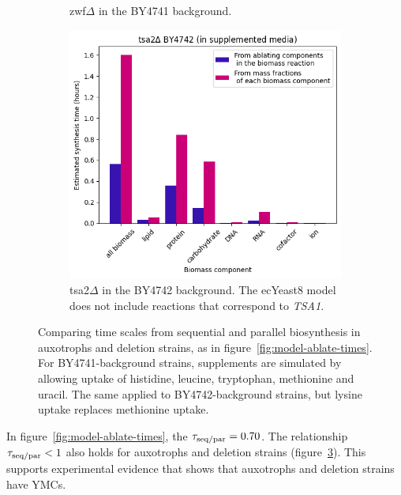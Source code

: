 \begin{figure}
\begin{subfigure}[htpb]{0.45\textwidth}
   \caption{
     zwf$\Delta$ in the BY4741 background.
   }
   \label{fig:model-ablation-zwf1}
  \end{subfigure}
  \begin{subfigure}[htpb]{0.45\textwidth}
   \centering
   \includegraphics[width=\textwidth]{ablation_tsa2}
   \caption{
     tsa2$\Delta$ in the BY4742 background.  The ecYeast8 model does not include reactions that correspond to \textit{TSA1}.
   }
   \label{fig:model-ablation-tsa2}
  \end{subfigure}
  \caption{
    Comparing time scales from sequential and parallel biosynthesis in auxotrophs and deletion strains, as in figure~\ref{fig:model-ablate-times}.
    For BY4741-background strains, supplements are simulated by allowing uptake of histidine, leucine, tryptophan, methionine and uracil.
    The same applied to BY4742-background strains, but lysine uptake replaces methionine uptake.
  }
  \label{fig:model-ablation-strains}
\end{figure}

In figure~\ref{fig:model-ablate-times}, the $\tau_{\mathrm{seq}/\mathrm{par}} = 0.70$.
The relationship $\tau_{\mathrm{seq}/\mathrm{par}} < 1$ also holds for auxotrophs and deletion strains (figure~\ref{fig:model-ablation-strains}).
This supports experimental evidence that shows that auxotrophs and deletion strains have YMCs.

